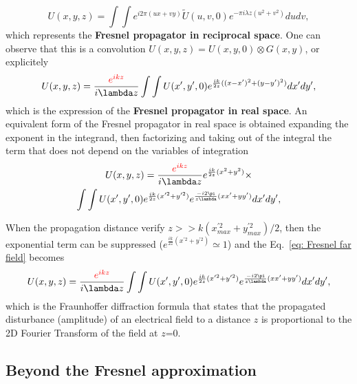 \documentclass{iucr}              %
\newcommand{\inred}[1]{{\color{red}#1}}
\begin{document}
\begin{equation}\label{eq: Fresnel in reciprocal space}
U(x,y,z) = \int\int e^{i 2 \pi (u x + v y) } \tilde{U}(u,v,0)  e^{- \pi i \lambda z (u^2 + v^2) } du dv,
\end{equation}
which represents the {\bf Fresnel propagator in reciprocal space}. 
One can observe that this is a convolution $U(x,y,z) = U(x,y,0) \otimes G(x,y) $, or explicitely
\begin{equation}\label{eq: Fresnel near field}
U(x,y,z) =  \frac{\inred{e^{i k z}}}{i \lambda z} \int\int U(x',y',0) e^{ \frac{i k}{2 z} ( (x-x')^2 + (y - y')^2) }  dx' dy',
\end{equation}
which is the expression of the {\bf Fresnel propagator in real space}. An equivalent form of the Fresnel propagator in real space is obtained expanding the exponent in the integrand, then factorizing and taking out of the integral the term that does not depend on the variables of integration
\begin{multline}\label{eq: Fresnel far field}
U(x,y,z) =  \frac{\inred{e^{i k z}}}{i \lambda z} e^{\frac{i k}{2 z} (x^2 + y^2) } \times \\
\int\int U(x',y',0) e^{ \frac{i k}{2 z} (x'^2 + y'^2) } 
e^{ \frac{-i 2 \pi}{z \lambda} (x x' + y y') } dx' dy',
\end{multline}

When the propagation distance verify $z >>k (x^{\prime 2}_{max} + y^{\prime 2}_{max})/2 $, then the exponential term can be suppressed 
($e^{\frac{i k}{2 z} (x^{\prime 2} + y^{\prime 2} )} \simeq 1$) and the Eq.~\ref{eq: Fresnel far field} becomes
\begin{equation}\label{eq: fraunhoffer}
U(x,y,z) = \frac{\inred{e^{i k z}}}{i \lambda z}
\int\int U(x',y',0) e^{ \frac{i k}{2 z} (x'^2 + y'^2) } 
e^{ \frac{-i 2 \pi}{z \lambda} (x x' + y y') } dx' dy',
\end{equation}
which is the Fraunhoffer diffraction formula that states that the propagated disturbance (amplitude) of an electrical field to a distance $z$ is proportional to the 2D Fourier Transform of the field at $z$=0. 

\subsection{Beyond the Fresnel approximation}
\end{document}
